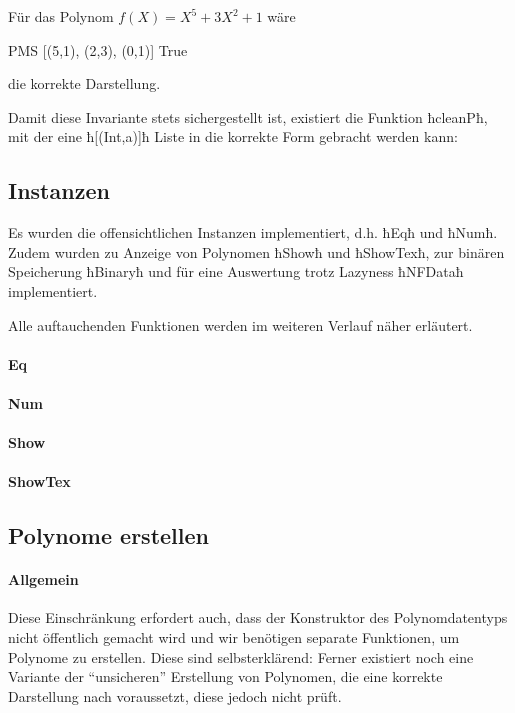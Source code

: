 \begin{beispiel}
  Für das Polynom $f(X) = X^5 + 3X^2 + 1$ wäre 
  \begin{hcode}
    PMS [(5,1), (2,3), (0,1)] True
  \end{hcode}
  die korrekte Darstellung.
\end{beispiel}

Damit diese Invariante stets sichergestellt ist, existiert die Funktion
ħcleanPħ, mit der eine ħ[(Int,a)]ħ Liste in die korrekte Form gebracht werden
kann:

\subsection{Instanzen}
Es wurden die offensichtlichen Instanzen implementiert, d.h.
ħEqħ und ħNumħ. Zudem wurden zu Anzeige von Polynomen ħShowħ und ħShowTexħ, zur
binären Speicherung ħBinaryħ und für eine Auswertung trotz Lazyness ħNFDataħ
implementiert.

Alle auftauchenden Funktionen werden im weiteren Verlauf näher erläutert.

\paragraph{Eq}\makebox{} 

\paragraph{Num}\makebox{}  
    
\paragraph{Show}\makebox{}  

\paragraph{ShowTex}\makebox{}  

\subsection{Polynome erstellen}
\paragraph{Allgemein}
Diese Einschränkung erfordert auch, dass der Konstruktor des Polynomdatentyps
nicht öffentlich gemacht wird und wir benötigen separate Funktionen, um
Polynome zu erstellen. Diese sind selbsterklärend:
Ferner existiert noch eine Variante der ``unsicheren'' Erstellung von
Polynomen, die eine korrekte Darstellung nach  voraussetzt,
diese jedoch nicht prüft. 


